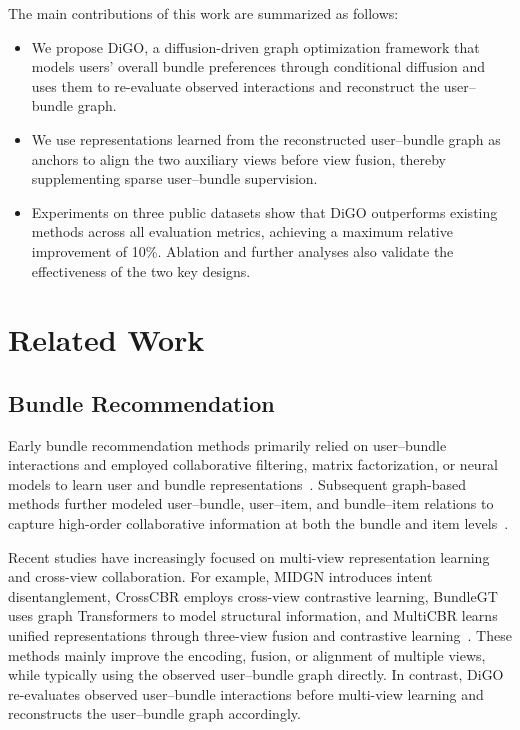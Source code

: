 \documentclass[letterpaper]{article}
\begin{document}
The main contributions of this work are summarized as follows:

\begin{itemize}
    \item We propose DiGO, a diffusion-driven graph optimization
    framework that models users' overall bundle preferences
    through conditional diffusion and uses them to re-evaluate
    observed interactions and reconstruct the user--bundle graph.

    \item We use representations learned from the reconstructed
    user--bundle graph as anchors to align the two auxiliary views
    before view fusion, thereby supplementing sparse user--bundle
    supervision.

    \item Experiments on three public datasets show that DiGO
    outperforms existing methods across all evaluation metrics,
    achieving a maximum relative improvement of 10\%. Ablation
    and further analyses also validate the effectiveness of the
    two key designs.
\end{itemize}
\section{Related Work}

\subsection{Bundle Recommendation}

Early bundle recommendation methods primarily relied on
user--bundle interactions and employed collaborative filtering,
matrix factorization, or neural models to learn user and bundle
representations~\cite{earlybundle1,earlybundle2}. Subsequent
graph-based methods further modeled user--bundle, user--item, and
bundle--item relations to capture high-order collaborative
information at both the bundle and item
levels~\cite{bgcn,graphbundle1}.

Recent studies have increasingly focused on multi-view
representation learning and cross-view collaboration. For
example, MIDGN introduces intent disentanglement, CrossCBR
employs cross-view contrastive learning, BundleGT uses graph
Transformers to model structural information, and MultiCBR
learns unified representations through three-view fusion and
contrastive learning~\cite{midgn,crosscbr,bundlegt,ma2024multicbr}.
These methods mainly improve the encoding, fusion, or alignment
of multiple views, while typically using the observed
user--bundle graph directly. In contrast, DiGO re-evaluates
observed user--bundle interactions before multi-view learning and
reconstructs the user--bundle graph accordingly.
\end{document}
